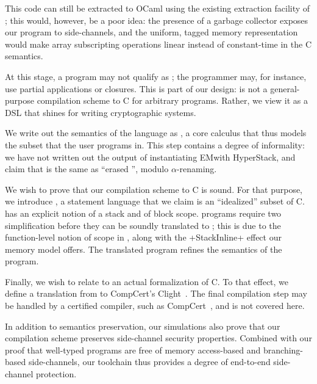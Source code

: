 This code can still be extracted to OCaml using the existing extraction facility
of \fstar; this would, however, be a poor idea: the presence of a garbage
collector exposes our program to side-channels, and the uniform, tagged memory
representation would make array subscripting operations linear instead of
constant-time in the C semantics.

At this stage, a program may not qualify as \lowstar; the programmer may, for
instance, use partial applications or closures. This is part of our design:
\lowstar is not a general-purpose compilation scheme to C for arbitrary \fstar
programs. Rather, we view it as a DSL that shines for writing cryptographic
systems. 

We write out the semantics of the \emfhst language as \lamstar, a core calculus
that thus models the \lowstar subset that the user programs in. This step
contains a degree of informality: we have not written out the output of
instantiating EM\fstar with HyperStack, and claim that \lamstar is the same as
``erased \emfhst'', modulo $\alpha$-renaming. 

We wish to prove that our compilation scheme to C is sound. For that purpose, we
introduce \cstar, a statement language that we claim is an ``idealized''
subset of C. \cstar has an explicit notion of a stack and of block scope.
\lamstar programs require two simplification before they can be soundly
translated to \cstar; this is due to the function-level notion of scope in
\lamstar, along with the \li+StackInline+ effect our memory model offers.
The translated \cstar program refines the semantics of the
\lamstar program. 

Finally, we wish to relate \cstar to an actual formalization of C. To that
effect, we define a translation from \cstar to Comp\-Cert's
Clight~\cite{Blazy-Leroy-Clight-09}. The final compilation step may be handled
by a certified compiler, such as
Comp\-Cert~\cite{Leroy-Compcert-CACM,compcert-url}, and is not covered here.

In addition to semantics preservation, our simulations also prove that our
compilation scheme preserves side-channel security properties. Combined with our
proof that well-typed \lowstar programs are free of memory access-based and
branching-based side-channels, our toolchain thus provides a degree of
end-to-end side-channel protection.

